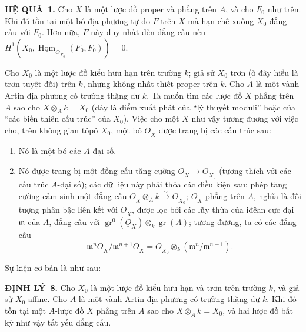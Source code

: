 \documentclass[11pt,twoside,openany]{book}
\numberwithin{equation}{section}
\newcommand{\src}[1]{%
  \phantomsection\hypertarget{src:\fgasourceid:#1}{}%
  \marginpar{\raggedleft\footnotesize\sffamily #1}%
}
\newcommand{\fgasourceid}{unset}
\newcommand{\Osh}{\underline{O}}
\newcommand{\Homsh}{\underline{\operatorname{Hom}}}
\newcommand{\result}[2]{\par\medskip\noindent\textbf{#1\if\relax\detokenize{#2}\relax\else\ #2\fi.}\quad}
\begin{document}
\result{HỆ QUẢ}{1} Cho $X$ là một lược đồ proper và phẳng trên $A$, và cho
$F_0$ như trên. Khi đó tồn tại một bó địa phương tự do $F$ trên $X$ mà hạn chế
xuống $X_0$ đẳng cấu với $F_0$. Hơn nữa, $F$ này duy nhất đến đẳng cấu nếu
$H^1(X_0,\Homsh_{\Osh_{X_0}}(F_0,F_0))=0$.

Cho $X_0$ là một lược đồ kiểu hữu hạn trên trường $k$; giả sử $X_0$ trơn (ở
đây hiểu là trơn tuyệt đối) trên $k$, nhưng không nhất thiết proper trên $k$.
Cho $A$ là một vành Artin địa phương có trường thặng dư $k$. Ta muốn tìm các
lược đồ $X$ phẳng trên $A$ sao cho $X\otimes_A k=X_0$ (đây là điểm xuất phát
của “lý thuyết moduli” hoặc của “các biến thiên cấu trúc” của $X_0$). Việc cho
một $X$ như vậy tương đương với việc cho, trên không gian tôpô $X_0$, một bó
$\Osh_X$ được trang bị các cấu trúc sau:
\begin{enumerate}
  \item[\textit{i.}] Nó là một bó các $A$-đại số.
  \item[\textit{ii.}] Nó được trang bị một đồng cấu tăng cường
    $\Osh_X\longrightarrow\Osh_{X_0}$ (tương thích với các cấu trúc
    $A$-đại số); các dữ liệu này phải thỏa các điều kiện sau: phép tăng cường
    cảm sinh một đẳng cấu
    $\Osh_X\otimes_A k\xrightarrow{\sim}\Osh_{X_0}$; $\Osh_X$ phẳng trên
    $A$, nghĩa là đối tượng phân bậc liên kết với $\Osh_X$, được lọc bởi các
    lũy thừa của iđêan cực đại $\mathfrak m$ của $A$, đẳng cấu với
    $\operatorname{gr}^0(\Osh_X)\otimes_k\operatorname{gr}(A)$; tương đương,
    ta có các đẳng cấu
    \[
      \mathfrak m^n\Osh_X/\mathfrak m^{n+1}\Osh_X
      =\Osh_{X_0}\otimes_k(\mathfrak m^n/\mathfrak m^{n+1}).
    \]
\end{enumerate}
Sự kiện cơ bản là như sau:

\src{204}
\result{ĐỊNH LÝ}{8} Cho $X_0$ là một lược đồ kiểu hữu hạn và trơn trên trường
$k$, và giả sử $X_0$ affine. Cho $A$ là một vành Artin địa phương có trường
thặng dư $k$. Khi đó tồn tại một $A$-lược đồ $X$ phẳng trên $A$ sao cho
$X\otimes_A k=X_0$, và hai lược đồ bất kỳ như vậy tất yếu đẳng cấu.
\end{document}

